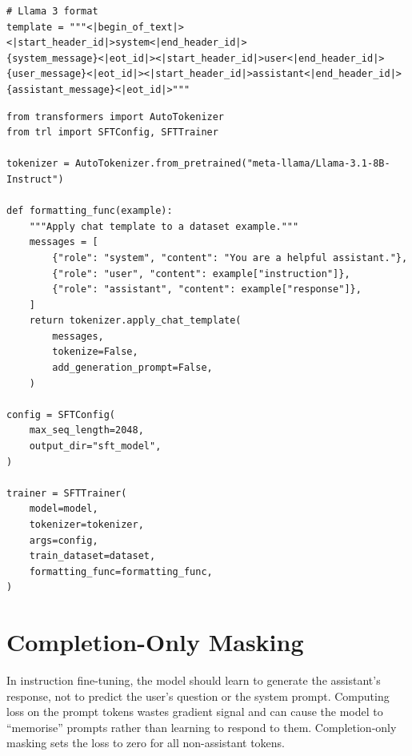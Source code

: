 \begin{lstlisting}[style=pythonstyle]
# Llama 3 format
template = """<|begin_of_text|><|start_header_id|>system<|end_header_id|>
{system_message}<|eot_id|><|start_header_id|>user<|end_header_id|>
{user_message}<|eot_id|><|start_header_id|>assistant<|end_header_id|>
{assistant_message}<|eot_id|>"""
\end{lstlisting}

\begin{examplebox}
\begin{lstlisting}[style=pythonstyle]
from transformers import AutoTokenizer
from trl import SFTConfig, SFTTrainer

tokenizer = AutoTokenizer.from_pretrained("meta-llama/Llama-3.1-8B-Instruct")

def formatting_func(example):
    """Apply chat template to a dataset example."""
    messages = [
        {"role": "system", "content": "You are a helpful assistant."},
        {"role": "user", "content": example["instruction"]},
        {"role": "assistant", "content": example["response"]},
    ]
    return tokenizer.apply_chat_template(
        messages,
        tokenize=False,
        add_generation_prompt=False,
    )

config = SFTConfig(
    max_seq_length=2048,
    output_dir="sft_model",
)

trainer = SFTTrainer(
    model=model,
    tokenizer=tokenizer,
    args=config,
    train_dataset=dataset,
    formatting_func=formatting_func,
)
\end{lstlisting}
\end{examplebox}

\section{Completion-Only Masking}
\label{sec:completion-masking}

\begin{intuitionbox}
In instruction fine-tuning, the model should learn to generate the assistant’s response, not to predict the user’s question or the system prompt. Computing loss on the prompt tokens wastes gradient signal and can cause the model to ``memorise'' prompts rather than learning to respond to them. Completion-only masking sets the loss to zero for all non-assistant tokens.
\end{intuitionbox}

